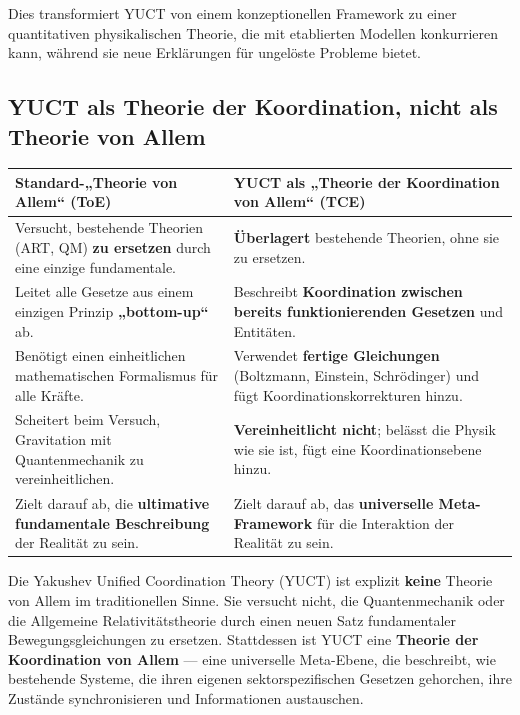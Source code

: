 \documentclass[11pt,a4paper]{article}
\begin{document}
	Dies transformiert YUCT von einem konzeptionellen Framework zu einer quantitativen physikalischen Theorie, die mit etablierten Modellen konkurrieren kann, während sie neue Erklärungen für ungelöste Probleme bietet.
	
	
	\subsection{YUCT als Theorie der Koordination, nicht als Theorie von Allem}
	\label{subsec:not-toe}
	
	\begin{tcolorbox}[title=YUCT vs. Standard-Theorien von Allem (ToE), 
		colback=blue!5!white, colframe=blue!50!black, 
		fonttitle=\bfseries, sharp corners]
		\small
		\begin{table}[H]
			\centering
			\begin{tabular}{p{0.45\textwidth} p{}}
				\toprule
				\textbf{Standard-„Theorie von Allem“ (ToE)} & \textbf{YUCT als „Theorie der Koordination von Allem“ (TCE)} \\
				\midrule
				Versucht, bestehende Theorien (ART, QM) \textbf{zu ersetzen} durch eine einzige fundamentale. & \textbf{Überlagert} bestehende Theorien, ohne sie zu ersetzen. \\
				\addlinespace
				Leitet alle Gesetze aus einem einzigen Prinzip \textbf{„bottom-up“} ab. & Beschreibt \textbf{Koordination zwischen bereits funktionierenden Gesetzen} und Entitäten. \\
				\addlinespace
				Benötigt einen einheitlichen mathematischen Formalismus für alle Kräfte. & Verwendet \textbf{fertige Gleichungen} (Boltzmann, Einstein, Schrödinger) und fügt Koordinationskorrekturen hinzu. \\
				\addlinespace
				Scheitert beim Versuch, Gravitation mit Quantenmechanik zu vereinheitlichen. & \textbf{Vereinheitlicht nicht}; belässt die Physik wie sie ist, fügt eine Koordinationsebene hinzu. \\
				\addlinespace
				Zielt darauf ab, die \textbf{ultimative fundamentale Beschreibung} der Realität zu sein. & Zielt darauf ab, das \textbf{universelle Meta-Framework} für die Interaktion der Realität zu sein. \\
				\bottomrule
			\end{tabular}
		\end{table}
	\end{tcolorbox}
	
	\vspace{0.5cm}
	\noindent
	Die Yakushev Unified Coordination Theory (YUCT) ist explizit \textbf{keine} Theorie von Allem im traditionellen Sinne. Sie versucht nicht, die Quantenmechanik oder die Allgemeine Relativitätstheorie durch einen neuen Satz fundamentaler Bewegungsgleichungen zu ersetzen. Stattdessen ist YUCT eine \textbf{Theorie der Koordination von Allem} — eine universelle Meta-Ebene, die beschreibt, wie bestehende Systeme, die ihren eigenen sektorspezifischen Gesetzen gehorchen, ihre Zustände synchronisieren und Informationen austauschen.
	
\end{document}
